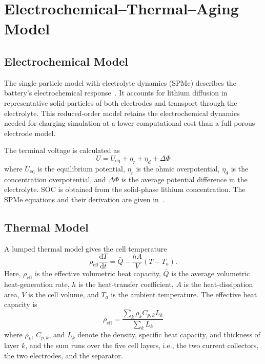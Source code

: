 \documentclass[lettersize,journal]{IEEEtran}
\begin{document}
\section{Electrochemical--Thermal--Aging Model}
\label{sec:model_section}

\subsection{Electrochemical Model}
\label{sec:model}

The single particle model with electrolyte dynamics (SPMe) describes the
battery's electrochemical response~\cite{refSPMe}. It accounts for lithium
diffusion in representative solid particles of both electrodes and transport
through the electrolyte. This reduced-order model retains the electrochemical
dynamics needed for charging simulation at a lower computational cost than a
full porous-electrode model.

The terminal voltage is calculated as~\cite{refSPMe}
\begin{equation}
U=U_{\mathrm{eq}}+\eta_r+\eta_d+\Delta\Phi
\label{eq:voltage}
\end{equation}
where $U_{\mathrm{eq}}$ is the equilibrium potential, $\eta_r$ is the ohmic
overpotential, $\eta_d$ is the concentration overpotential, and $\Delta\Phi$
is the average potential difference in the electrolyte. SOC is obtained from
the solid-phase lithium concentration. The SPMe equations and their derivation
are given in~\cite{refSPMe}.

\subsection{Thermal Model}

A lumped thermal model gives the cell temperature
\begin{equation}
\rho_{\mathrm{eff}}\frac{\mathrm{d}T}{\mathrm{d}t}=\bar Q-\frac{hA}{V}(T-T_a).
\label{eq:thermal_balance}
\end{equation}
Here, $\rho_{\mathrm{eff}}$ is the effective volumetric heat capacity,
$\bar Q$ is the average volumetric heat-generation rate, $h$ is the
heat-transfer coefficient, $A$ is the heat-dissipation area, $V$ is the cell
volume, and $T_a$ is the ambient temperature. The effective heat capacity is
\begin{equation}
\rho_{\mathrm{eff}}=\frac{\sum_k\rho_kC_{p,k}L_k}{\sum_kL_k}
\label{eq:rho_eff}
\end{equation}
where $\rho_k$, $C_{p,k}$, and $L_k$ denote the density, specific heat
capacity, and thickness of layer $k$, and the sum runs over the five cell
layers, i.e., the two current collectors, the two electrodes, and the
separator.
\end{document}
